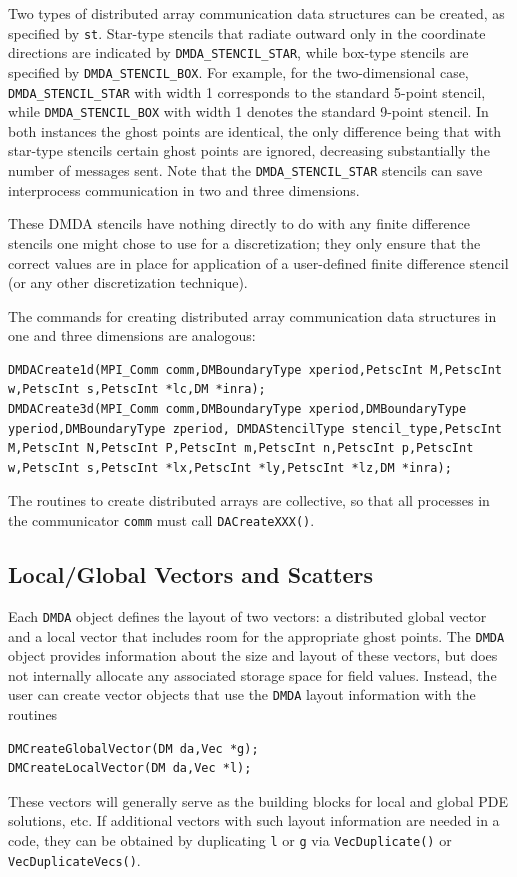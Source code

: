 Two types of distributed array communication data structures
can be created, as specified by \lstinline{st}.
Star-type stencils that radiate outward only in the coordinate
directions are indicated by \lstinline{DMDA_STENCIL_STAR},
while box-type stencils are specified by
\lstinline{DMDA_STENCIL_BOX}. For example, for the
two-dimensional case,
\lstinline{DMDA_STENCIL_STAR} with width 1 corresponds to the standard 5-point
stencil, while \lstinline{DMDA_STENCIL_BOX} with width 1 denotes the
standard 9-point stencil.  In both instances the ghost points are
identical, the only difference being that with star-type stencils
certain ghost points are ignored, decreasing substantially
the number of messages sent.  Note that the \lstinline{DMDA_STENCIL_STAR}
stencils can save interprocess communication in two and three
dimensions.

These DMDA stencils have nothing directly to do with any finite
difference stencils one might chose to use for a discretization; they
only ensure that the correct values are in place for application of a
user-defined finite difference stencil (or any other
discretization technique).

The commands for creating distributed array communication data structures
in one and three dimensions are analogous:
\begin{lstlisting}
DMDACreate1d(MPI_Comm comm,DMBoundaryType xperiod,PetscInt M,PetscInt w,PetscInt s,PetscInt *lc,DM *inra);
DMDACreate3d(MPI_Comm comm,DMBoundaryType xperiod,DMBoundaryType yperiod,DMBoundaryType zperiod, DMDAStencilType stencil_type,PetscInt M,PetscInt N,PetscInt P,PetscInt m,PetscInt n,PetscInt p,PetscInt w,PetscInt s,PetscInt *lx,PetscInt *ly,PetscInt *lz,DM *inra);
\end{lstlisting}
The routines to create distributed arrays are collective, so that all
processes in the communicator \lstinline{comm} must call \lstinline{DACreateXXX()}.

\subsection{Local/Global Vectors and Scatters}

Each \lstinline{DMDA} object defines the layout of two vectors: a distributed
global vector and a local vector that includes room for the
appropriate ghost points.  The \lstinline{DMDA} object provides information
about the size and layout of these vectors, but does not internally
allocate any associated storage space for field values.  Instead, the
user can create vector objects that use the \lstinline{DMDA} layout
information with the routines
\begin{lstlisting}
DMCreateGlobalVector(DM da,Vec *g);
DMCreateLocalVector(DM da,Vec *l);
\end{lstlisting}
These vectors will generally serve as the building blocks for local
and global PDE solutions, etc.  If additional vectors with such
layout information are needed in a code, they can be obtained by
duplicating \lstinline{l} or \lstinline{g} via
\lstinline{VecDuplicate()} or \lstinline{VecDuplicateVecs()}.

